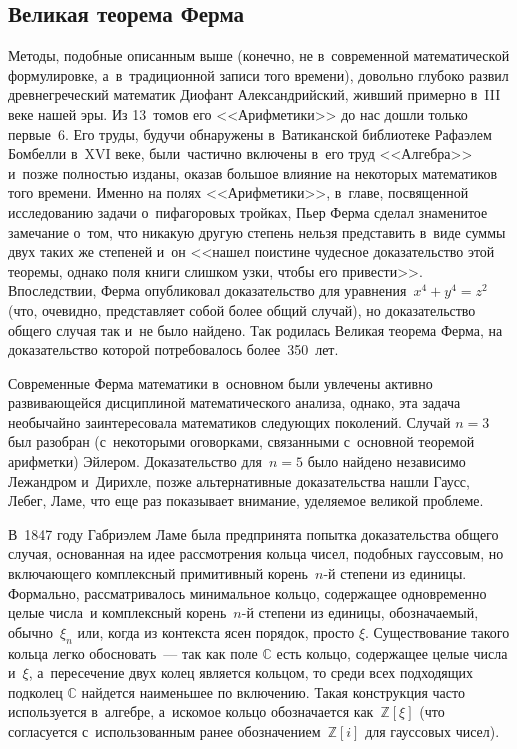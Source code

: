 \documentclass{article}
\begin{document}
\subsection{Великая теорема Ферма}
Методы, подобные описанным выше (конечно, не в~современной математической
формулировке, а~в~традиционной записи того времени), довольно глубоко развил
древнегреческий математик Диофант Александрийский, живший примерно в~III веке
нашей эры. Из 13~томов его <<Арифметики>> до нас дошли только первые~6. Его
труды, будучи обнаружены в~Ватиканской библиотеке Рафаэлем Бомбелли в~XVI веке,
были~частично включены в~его труд <<Алгебра>> и~позже полностью изданы, оказав
большое влияние на некоторых математиков того времени. Именно на полях
<<Арифметики>>, в~главе, посвященной исследованию задачи о~пифагоровых тройках,
Пьер Ферма сделал знаменитое замечание о~том, что никакую другую степень нельзя
представить в~виде суммы двух таких же степеней и~он <<нашел поистине чудесное
доказательство этой теоремы, однако поля книги слишком узки, чтобы его
привести>>. Впоследствии, Ферма опубликовал доказательство для
уравнения~$x^4 + y^4 = z^2$ (что, очевидно, представляет собой более общий
случай), но доказательство общего случая так и~не было найдено. Так родилась
Великая теорема Ферма, на доказательство которой потребовалось более~350~лет.

Современные Ферма математики в~основном были увлечены активно развивающейся
дисциплиной математического анализа, однако, эта задача необычайно
заинтересовала математиков следующих поколений. Случай $n = 3$ был разобран
(с~некоторыми оговорками, связанными с~основной теоремой арифметки) Эйлером.
Доказательство для~$n = 5$ было найдено независимо Лежандром и~Дирихле, позже
альтернативные доказательства нашли Гаусс, Лебег, Ламе, что еще раз показывает
внимание, уделяемое великой проблеме.

В~1847 году Габриэлем Ламе была предпринята попытка доказательства общего
случая, основанная на идее рассмотрения кольца чисел, подобных гауссовым, но
включающего комплексный примитивный корень~$n$-й степени из единицы. Формально,
рассматривалось минимальное кольцо, содержащее одновременно целые числа~и
комплексный корень~$n$-й степени из единицы, обозначаемый, обычно~$\xi_n$ или,
когда из контекста ясен порядок, просто $\xi$. Существование такого кольца
легко обосновать~--- так как поле $\mathbb{C}$ есть кольцо, содержащее целые
числа и~$\xi$, а~пересечение двух колец является кольцом, то среди всех
подходящих подколец $\mathbb{C}$ найдется наименьшее по включению. Такая
конструкция часто используется в~алгебре, а~искомое кольцо обозначается
как~$\mathbb{Z}[\xi]$ (что согласуется с~использованным ранее
обозначением~$\mathbb{Z}[i]$ для гауссовых чисел).
\end{document}
